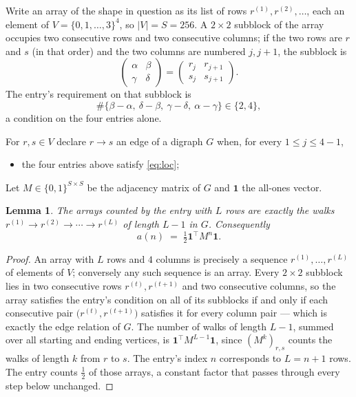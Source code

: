 \documentclass[11pt,a4paper]{article}
\theoremstyle{plain}
\newtheorem{lemma}[theorem]{Lemma}
\theoremstyle{definition}
\begin{document}
Write an array of the shape in question as its list of rows
$r^{(1)},r^{(2)},\dots$, each an element of
$V=\{0,1,\dots,3\}^{4}$, so $|V|=S=256$. A $2\times2$ subblock of the array
occupies two consecutive rows and two consecutive columns; if the two rows are $r$
and $s$ (in that order) and the two columns are numbered $j,j+1$,
the subblock is
\[
\begin{pmatrix}\alpha&\beta\\\gamma&\delta\end{pmatrix}=\begin{pmatrix}r_j&r_{j+1}\\s_j&s_{j+1}\end{pmatrix}.
\]
The entry's requirement on that subblock is
\begin{equation}\label{eq:loc}
\#\{\beta-\alpha,\ \delta-\beta,\ \gamma-\delta,\ \alpha-\gamma\}\in\{2,4\},
\end{equation}
a condition on the four entries alone.

For $r,s\in V$ declare $r\to s$ an edge of a digraph $G$ when, for every
$1\le j\le 4-1$,
\begin{itemize}
\item the four entries above satisfy \eqref{eq:loc};

\end{itemize}
Let $M\in\{0,1\}^{S\times S}$ be the adjacency matrix of $G$ and $\mathbf{1}$ the
all-ones vector.

\begin{lemma}\label{lem:walk}
The arrays counted by the entry with $L$ rows are exactly the walks
$r^{(1)}\to r^{(2)}\to\cdots\to r^{(L)}$ of length $L-1$ in $G$. Consequently
\[
a(n)\;=\;\tfrac1{2}\mathbf{1}^{\!\top}M^{n}\mathbf{1} .
\]
\end{lemma}

\begin{proof}
An array with $L$ rows and $4$ columns is precisely a sequence
$r^{(1)},\dots,r^{(L)}$ of elements of $V$; conversely any such sequence is an array.
Every $2\times2$ subblock lies in two consecutive rows $r^{(t)},r^{(t+1)}$ and two
consecutive columns, so the array satisfies the entry's condition on all of its subblocks
if and only if each consecutive pair $\bigl(r^{(t)},r^{(t+1)}\bigr)$ satisfies it for
every column pair --- which is exactly the edge relation of $G$. The number of walks of
length $L-1$, summed over all starting and ending vertices, is
$\mathbf{1}^{\!\top}M^{L-1}\mathbf{1}$, since $(M^{k})_{r,s}$ counts the walks of
length $k$ from $r$ to $s$. The entry's index $n$ corresponds to $L=n+1$ rows. The entry counts $\tfrac1{2}$ of those arrays, a constant factor that passes through every step below unchanged.
\end{proof}
\end{document}
